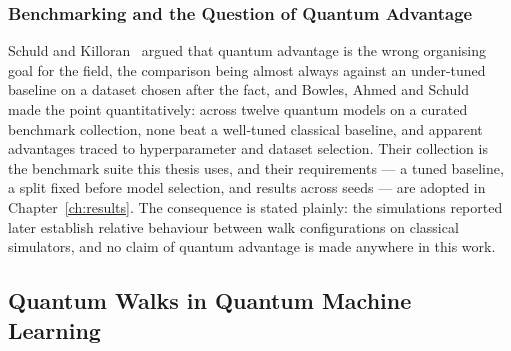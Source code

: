 \subsubsection{Benchmarking and the Question of Quantum Advantage}
\label{sec:lr-bench}
Schuld and Killoran~\cite{Schuld_2022} argued that quantum advantage is the
wrong organising goal for the field, the comparison being almost always
against an under-tuned baseline on a dataset chosen after the fact, and
Bowles, Ahmed and Schuld~\cite{Bowles_2024} made the point quantitatively:
across twelve quantum models on a curated benchmark collection, none beat a
well-tuned classical baseline, and apparent advantages traced to
hyperparameter and dataset selection. Their collection is the benchmark suite
this thesis uses, and their requirements --- a tuned baseline, a split fixed
before model selection, and results across seeds --- are adopted in
Chapter~\ref{ch:results}. The consequence is stated plainly: the simulations
reported later establish relative behaviour between walk configurations on
classical simulators, and no claim of quantum advantage is made anywhere in
this work.

\subsection{Quantum Walks in Quantum Machine Learning}
\label{sec:lr-dtqwqml}


